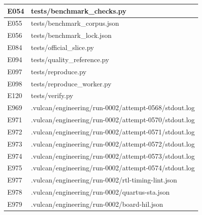 \documentclass[11pt,a4paper]{article}
\begin{document}
{\begin{longtable}{@{}L{0.12\textwidth}|L{0.82\textwidth}@{}}
E054 & tests/\allowbreak{}benchmark\_\allowbreak{}checks.py\\[2pt]\hline

E055 & tests/\allowbreak{}benchmark\_\allowbreak{}corpus.json\\[2pt]\hline

E056 & tests/\allowbreak{}benchmark\_\allowbreak{}lock.json\\[2pt]\hline

E084 & tests/\allowbreak{}official\_\allowbreak{}slice.py\\[2pt]\hline

E094 & tests/\allowbreak{}quality\_\allowbreak{}reference.py\\[2pt]\hline

E097 & tests/\allowbreak{}reproduce.py\\[2pt]\hline

E098 & tests/\allowbreak{}reproduce\_\allowbreak{}worker.py\\[2pt]\hline

E120 & tests/\allowbreak{}verify.py\\[2pt]\hline

E969 & .vulcan/\allowbreak{}engineering/\allowbreak{}run-0002/\allowbreak{}attempt-0568/\allowbreak{}stdout.log\\[2pt]\hline

E971 & .vulcan/\allowbreak{}engineering/\allowbreak{}run-0002/\allowbreak{}attempt-0570/\allowbreak{}stdout.log\\[2pt]\hline

E972 & .vulcan/\allowbreak{}engineering/\allowbreak{}run-0002/\allowbreak{}attempt-0571/\allowbreak{}stdout.log\\[2pt]\hline

E973 & .vulcan/\allowbreak{}engineering/\allowbreak{}run-0002/\allowbreak{}attempt-0572/\allowbreak{}stdout.log\\[2pt]\hline

E974 & .vulcan/\allowbreak{}engineering/\allowbreak{}run-0002/\allowbreak{}attempt-0573/\allowbreak{}stdout.log\\[2pt]\hline

E975 & .vulcan/\allowbreak{}engineering/\allowbreak{}run-0002/\allowbreak{}attempt-0574/\allowbreak{}stdout.log\\[2pt]\hline

E977 & .vulcan/\allowbreak{}engineering/\allowbreak{}run-0002/\allowbreak{}rtl-timing-lint.json\\[2pt]\hline

E978 & .vulcan/\allowbreak{}engineering/\allowbreak{}run-0002/\allowbreak{}quartus-sta.json\\[2pt]\hline

E979 & .vulcan/\allowbreak{}engineering/\allowbreak{}run-0002/\allowbreak{}board-hil.json\\[2pt]\hline

\bottomrule\end{longtable}}
\end{document}
